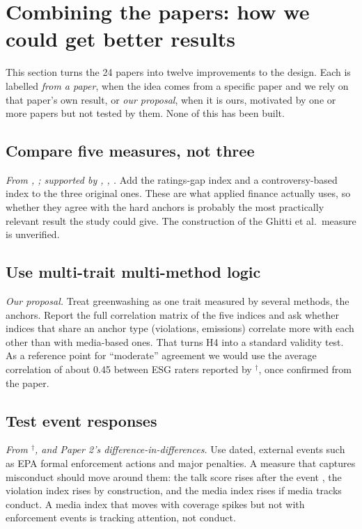 \documentclass[12pt,a4paper]{article}
\newcommand{\dg}{$^{\dagger}$}          %
\begin{document}
\section{Combining the papers: how we could get better results}
\label{sec:combining}

This section turns the 24 papers into twelve improvements to the design. Each is labelled
\emph{from a paper}, when the idea comes from a specific paper and we rely on that paper's own
result, or \emph{our proposal}, when it is ours, motivated by one or more papers but not tested by
them. None of this has been built.

\subsection{Compare five measures, not three}
\emph{From \citet{yu2020}, \citet{ghitti2024}; supported by \citet{luu2025}, \citet{liu2024},
\citet{bacher2025}.} Add the ratings-gap index and a controversy-based index to the three original
ones. These are what applied finance actually uses, so whether they agree with the hard anchors is
probably the most practically relevant result the study could give. The construction of the Ghitti
et al.\ measure is unverified.

\subsection{Use multi-trait multi-method logic}
\emph{Our proposal.} Treat greenwashing as one trait measured by several methods, the anchors.
Report the full correlation matrix of the five indices and ask whether indices that share an anchor
type (violations, emissions) correlate more with each other than with media-based ones. That turns
H4 into a standard validity test. As a reference point for ``moderate'' agreement we would use the
average correlation of about 0.45 between ESG raters reported by \citet{gibsonbrandon2021}\dg, once
confirmed from the paper.

\subsection{Test event responses}
\emph{From \citet{utz2019}\dg, \citet{cho2009} and Paper 2's difference-in-differences.} Use dated,
external events such as EPA formal enforcement actions and major penalties. A measure that
captures misconduct should move around them: the talk score rises after the event
\citep{gorovaia2025,cho2009}, the violation index rises by construction, and the media index rises
if media tracks conduct. A media index that moves with coverage spikes but not with enforcement
events is tracking attention, not conduct.
\end{document}
